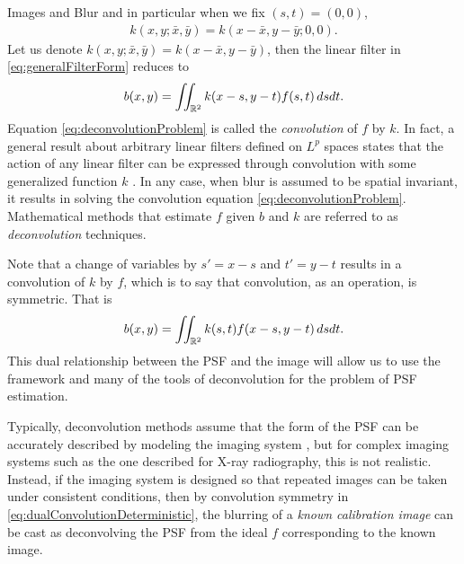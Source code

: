 \begin{chapter}{Images and Blur}
  and in particular when we fix $(s,t) = (0,0)$,
\begin{align} 
 k(x,y;\bar x,\bar y) = k(x-\bar x,y-\bar y;0,0).
\end{align}
  Let us denote $k(x,y;\bar x,\bar y) = k(x-\bar x,y-\bar y)$, then the linear filter in \eqref{eq:generalFilterForm} reduces to   
\begin{equation}\label{eq:deconvolutionProblem}
  b(x,y) = \iint_{\mathbb R^2} k(x-s,y-t) f(s,t)\,dsdt.
\end{equation}
  Equation \eqref{eq:deconvolutionProblem} is called the \emph{convolution} of $f$ by $k$.
  In fact, a general result about arbitrary linear filters defined on $L^p$ spaces states that the action of any linear filter can be expressed through convolution with some generalized function $k$ \citep{grafakos2014}.
  In any case, when blur is assumed to be spatial invariant, it results in solving the convolution equation \eqref{eq:deconvolutionProblem}.
  Mathematical methods that estimate $f$ given $b$ and $k$ are referred to as \emph{deconvolution} techniques.

  Note that a change of variables by $s'=x-s$ and $t'=y-t$ results in a convolution of $k$ by $f$, which is to say that convolution, as an operation, is symmetric.
  That is
\begin{equation}\label{eq:dualConvolutionDeterministic}
  b(x,y) = \iint_{\mathbb R^2} k(s,t) f(x-s,y-t)\,dsdt.
\end{equation}
  This dual relationship between the PSF and the image will allow us to use the framework and many of the tools of deconvolution for the problem of PSF estimation.

  Typically, deconvolution methods assume that the form of the PSF can be accurately described by modeling the imaging system \citep{jain1989,hansen2010}, but for complex imaging systems such as the one described for X-ray radiography, this is not realistic.
  Instead, if the imaging system is designed so that repeated images can be taken under consistent conditions, then by convolution symmetry in \eqref{eq:dualConvolutionDeterministic}, the blurring of a \emph{known calibration image} can be cast as deconvolving the PSF from the ideal $f$ corresponding to the known image.


\end{chapter}
